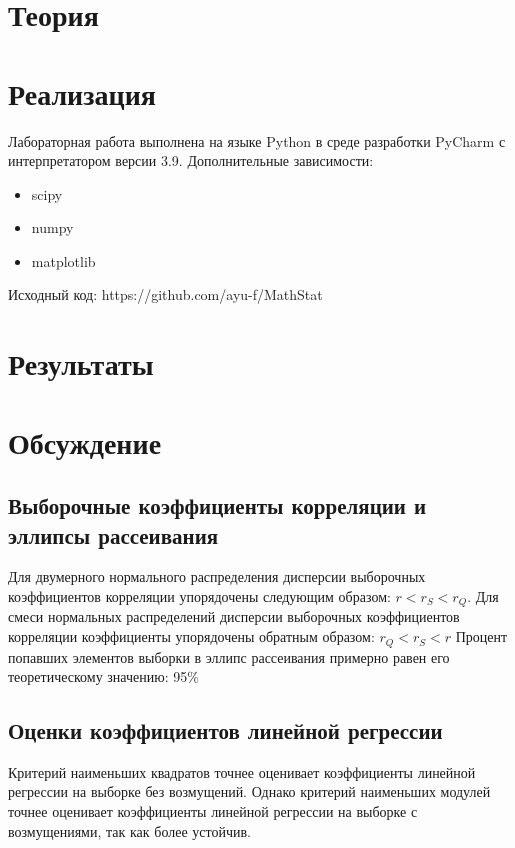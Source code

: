 \documentclass[14pt,a4paper,article]{ncc}
\begin{document}
\newpage
\section{Теория}


\section{Реализация}
Лабораторная работа выполнена на языке Python в среде разработки PyCharm с интерпретатором версии 3.9. Дополнительные зависимости:
\begin{itemize}
    \item scipy
    \item numpy
    \item matplotlib
\end{itemize}
Исходный код: https://github.com/ayu-f/MathStat

\section{Результаты}

\section{Обсуждение}
\begin{flushleft}
\subsection{Выборочные коэффициенты корреляции и эллипсы рассеивания}
\noindent Для двумерного нормального распределения дисперсии выборочных коэффициентов корреляции упорядочены следующим образом: $r <  r_S < r_Q$. 
Для смеси нормальных распределений дисперсии выборочных
коэффициентов корреляции коэффициенты упорядочены обратным образом: $r_Q <  r_S < r$
\newline
Процент попавших элементов выборки в эллипс рассеивания примерно равен его теоретическому значению: 95$\%$
\end{flushleft}
\subsection{Оценки коэффициентов линейной регрессии}
\begin{flushleft}
Критерий наименьших квадратов точнее оценивает коэффициенты
линейной регрессии на выборке без возмущений.
Однако критерий наименьших модулей точнее оценивает коэффициенты линейной регрессии на выборке с возмущениями, так как более устойчив.
\end{flushleft}
\end{document}

